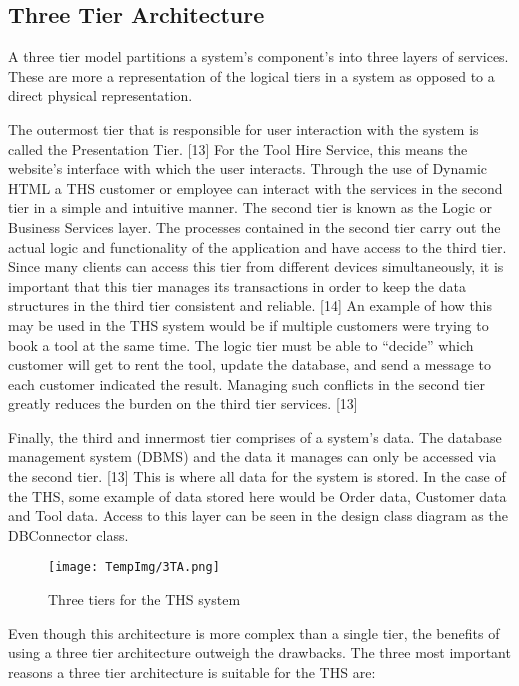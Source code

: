 \documentclass[fontsize=11pt]{extarticle}
\numberwithin{figure}{section} %
\numberwithin{table}{section}%
\begin{document}
\hypertarget{three-tier-architecture}{%
\subsection{Three Tier Architecture}\label{three-tier-architecture}}

A three tier model partitions a system's component's into three layers
of services. These are more a representation of the logical tiers in a
system as opposed to a direct physical representation.

The outermost tier that is responsible for user interaction with the
system is called the Presentation Tier. {[}13{]} For the Tool Hire
Service, this means the website's interface with which the user
interacts. Through the use of Dynamic HTML a THS customer or employee
can interact with the services in the second tier in a simple and
intuitive manner. The second tier is known as the Logic or Business
Services layer. The processes contained in the second tier carry out the
actual logic and functionality of the application and have access to the
third tier. Since many clients can access this tier from different
devices simultaneously, it is important that this tier manages its
transactions in order to keep the data structures in the third tier
consistent and reliable. {[}14{]} An example of how this may be used in
the THS system would be if multiple customers were trying to book a tool
at the same time. The logic tier must be able to ``decide'' which
customer will get to rent the tool, update the database, and send a
message to each customer indicated the result. Managing such conflicts
in the second tier greatly reduces the burden on the third tier
services. {[}13{]}

Finally, the third and innermost tier comprises of a system's data. The
database management system (DBMS) and the data it manages can only be
accessed via the second tier. {[}13{]} This is where all data for the
system is stored. In the case of the THS, some example of data stored
here would be Order data, Customer data and Tool data. Access to this
layer can be seen in the design class diagram as the DBConnector class.

\begin{figure}[H]
      \centering
      \texttt{[image: TempImg/3TA.png]}
      \caption{Three tiers for the THS system}
\end{figure}

Even though this architecture is more complex than a single tier, the
benefits of using a three tier architecture outweigh the drawbacks. The
three most important reasons a three tier architecture is suitable for
the THS are:
\end{document}
